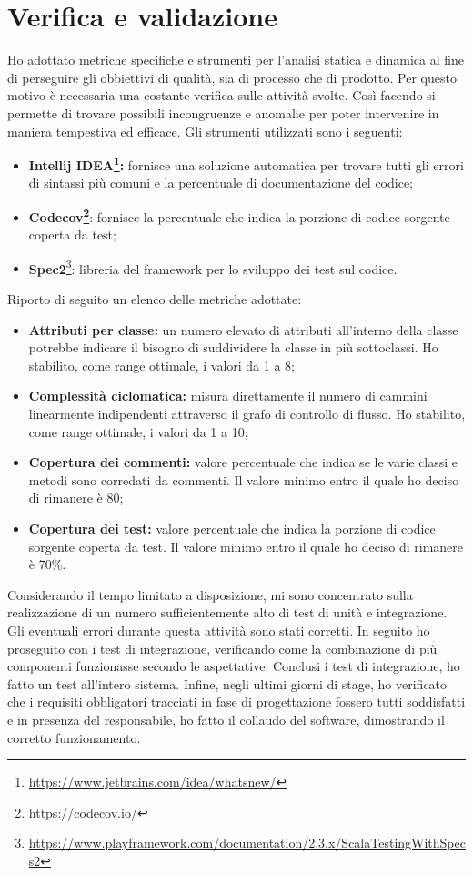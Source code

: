 \section{Verifica e validazione}\label{metriche}
Ho adottato metriche specifiche e strumenti per l'analisi statica e dinamica al fine di perseguire gli obbiettivi di qualità, sia di processo che di prodotto. Per questo motivo è necessaria una costante verifica sulle attività svolte. Così facendo si permette di trovare possibili incongruenze e anomalie per poter intervenire in maniera tempestiva ed efficace.
Gli strumenti utilizzati sono i seguenti:
\begin{itemize}
	\item \textbf{Intellij IDEA\footnote{\url{https://www.jetbrains.com/idea/whatsnew/}}: }fornisce una soluzione automatica per trovare tutti gli errori di sintassi più comuni e la percentuale di documentazione del codice;
	\item \textbf{Codecov\footnote{\url{https://codecov.io/}}}: fornisce la percentuale che indica la porzione di codice sorgente coperta da test;
	\item \textbf{Spec2}\footnote{\url{https://www.playframework.com/documentation/2.3.x/ScalaTestingWithSpecs2}}: libreria del framework per lo sviluppo dei test sul codice.
\end{itemize}
Riporto di seguito un elenco delle metriche adottate:
\begin{itemize}
	\item \textbf{Attributi per classe:} un numero elevato di attributi all'interno della classe potrebbe indicare il bisogno di suddividere la classe in più sottoclassi. Ho stabilito, come range ottimale, i valori da 1 a 8;
	\item \textbf{Complessità ciclomatica:} misura direttamente il numero di cammini linearmente indipendenti attraverso il grafo di controllo di flusso. Ho stabilito, come range ottimale, i valori da 1 a 10;
	\item \textbf{Copertura dei commenti:} valore percentuale che indica se le varie classi e metodi sono corredati da commenti. Il valore minimo entro il quale ho deciso di rimanere è 80;
	\item \textbf{Copertura dei test:} valore percentuale che indica la porzione di codice sorgente coperta da test. Il valore minimo entro il quale ho deciso di rimanere è 70\%.
\end{itemize}
Considerando il tempo limitato a disposizione, mi sono concentrato sulla realizzazione di un numero sufficientemente alto di test di unità e integrazione.\\
Gli eventuali errori durante questa attività sono stati corretti. In seguito ho proseguito con i test di integrazione, verificando come la combinazione di più componenti funzionasse secondo le aspettative. Conclusi i test di integrazione, ho fatto un test all'intero sistema. Infine, negli ultimi giorni di stage, ho verificato che i requisiti obbligatori tracciati in fase di progettazione fossero tutti soddisfatti e in presenza del responsabile, ho fatto il collaudo del software, dimostrando il corretto funzionamento.\\

